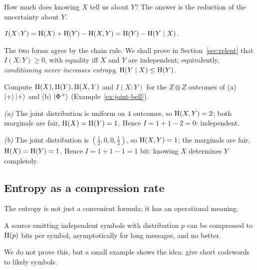 How much does knowing $X$ tell us about $Y$? The answer is the reduction of the uncertainty about $Y$.

\begin{definition}\label{def:mutualinfo}
  $I(X\!:\!Y)=\mathrm{H}(X)+\mathrm{H}(Y)-\mathrm{H}(X,Y)=\mathrm{H}(Y)-\mathrm{H}(Y\mid X)$.
\end{definition}

The two forms agree by the chain rule. We shall prove in Section~\ref{sec:relent} that $I(X\!:\!Y)\ge0$, with equality iff $X$ and $Y$ are independent; equivalently, \emph{conditioning never increases entropy}, $\mathrm{H}(Y\mid X)\le\mathrm{H}(Y)$.

\begin{example}\label{ex:mutual-info}
  Compute $\mathrm{H}(X),\mathrm{H}(Y),\mathrm{H}(X,Y)$ and $I(X\!:\!Y)$ for the $Z\otimes Z$ outcomes of (a) $\left|+\right\rangle\left|+\right\rangle$ and (b) $\left|\Phi^+\right\rangle$ (Example~\ref{ex:joint-bell}).
\end{example}
\begin{solution}
  \begin{steps}
    \item \emph{(a)} The joint distribution is uniform on $4$ outcomes, so $\mathrm{H}(X,Y)=2$; both marginals are fair, $\mathrm{H}(X)=\mathrm{H}(Y)=1$. Hence $I=1+1-2=0$: independent.
    \item \emph{(b)} The joint distribution is $(\tfrac12,0,0,\tfrac12)$, so $\mathrm{H}(X,Y)=1$; the marginals are fair, $\mathrm{H}(X)=\mathrm{H}(Y)=1$. Hence $I=1+1-1=1$ bit: knowing $X$ determines $Y$ completely.
  \end{steps}
\end{solution}

\subsection{Entropy as a compression rate}

The entropy is not just a convenient formula; it has an operational meaning.

\begin{theorem}\label{thm:source-coding}
  A source emitting independent symbols with distribution $p$ can be compressed to $\mathrm{H}(p)$ bits per symbol, asymptotically for long messages, and no better.
\end{theorem}

We do not prove this, but a small example shows the idea: give short codewords to likely symbols.

